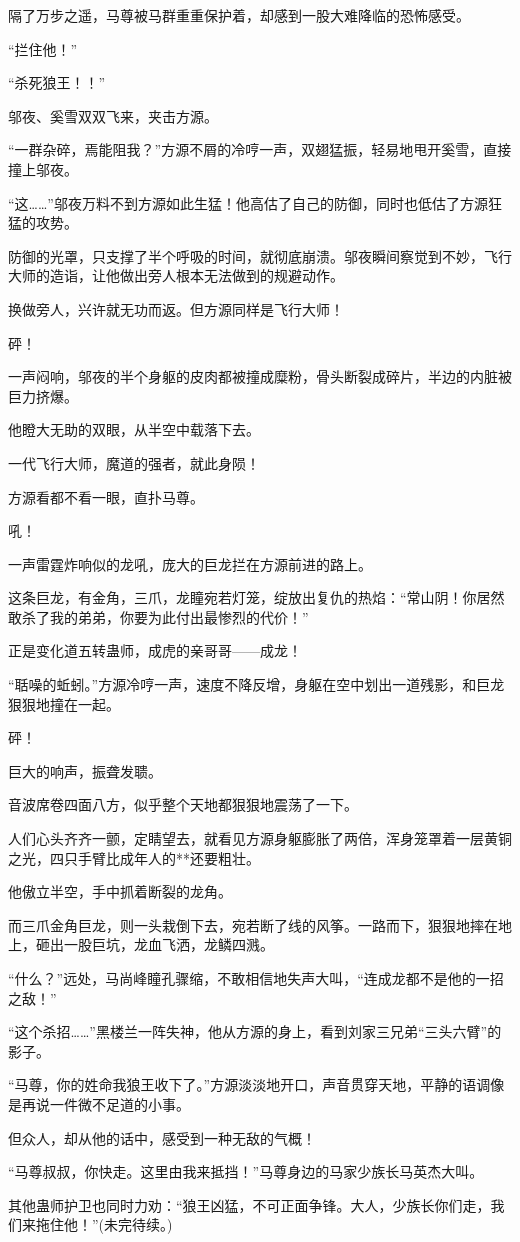 \begin{this_body}
隔了万步之遥，马尊被马群重重保护着，却感到一股大难降临的恐怖感受。

“拦住他！”

“杀死狼王！！”

邬夜、奚雪双双飞来，夹击方源。

“一群杂碎，焉能阻我？”方源不屑的冷哼一声，双翅猛振，轻易地甩开奚雪，直接撞上邬夜。

“这……”邬夜万料不到方源如此生猛！他高估了自己的防御，同时也低估了方源狂猛的攻势。

防御的光罩，只支撑了半个呼吸的时间，就彻底崩溃。邬夜瞬间察觉到不妙，飞行大师的造诣，让他做出旁人根本无法做到的规避动作。

换做旁人，兴许就无功而返。但方源同样是飞行大师！

砰！

一声闷响，邬夜的半个身躯的皮肉都被撞成糜粉，骨头断裂成碎片，半边的内脏被巨力挤爆。

他瞪大无助的双眼，从半空中载落下去。

一代飞行大师，魔道的强者，就此身陨！

方源看都不看一眼，直扑马尊。

吼！

一声雷霆炸响似的龙吼，庞大的巨龙拦在方源前进的路上。

这条巨龙，有金角，三爪，龙瞳宛若灯笼，绽放出复仇的热焰：“常山阴！你居然敢杀了我的弟弟，你要为此付出最惨烈的代价！”

正是变化道五转蛊师，成虎的亲哥哥——成龙！

“聒噪的蚯蚓。”方源冷哼一声，速度不降反增，身躯在空中划出一道残影，和巨龙狠狠地撞在一起。

砰！

巨大的响声，振聋发聩。

音波席卷四面八方，似乎整个天地都狠狠地震荡了一下。

人们心头齐齐一颤，定睛望去，就看见方源身躯膨胀了两倍，浑身笼罩着一层黄铜之光，四只手臂比成年人的**还要粗壮。

他傲立半空，手中抓着断裂的龙角。

而三爪金角巨龙，则一头栽倒下去，宛若断了线的风筝。一路而下，狠狠地摔在地上，砸出一股巨坑，龙血飞洒，龙鳞四溅。

“什么？”远处，马尚峰瞳孔骤缩，不敢相信地失声大叫，“连成龙都不是他的一招之敌！”

“这个杀招……”黑楼兰一阵失神，他从方源的身上，看到刘家三兄弟“三头六臂”的影子。

“马尊，你的姓命我狼王收下了。”方源淡淡地开口，声音贯穿天地，平静的语调像是再说一件微不足道的小事。

但众人，却从他的话中，感受到一种无敌的气概！

“马尊叔叔，你快走。这里由我来抵挡！”马尊身边的马家少族长马英杰大叫。

其他蛊师护卫也同时力劝：“狼王凶猛，不可正面争锋。大人，少族长你们走，我们来拖住他！”(未完待续。)

\end{this_body}


